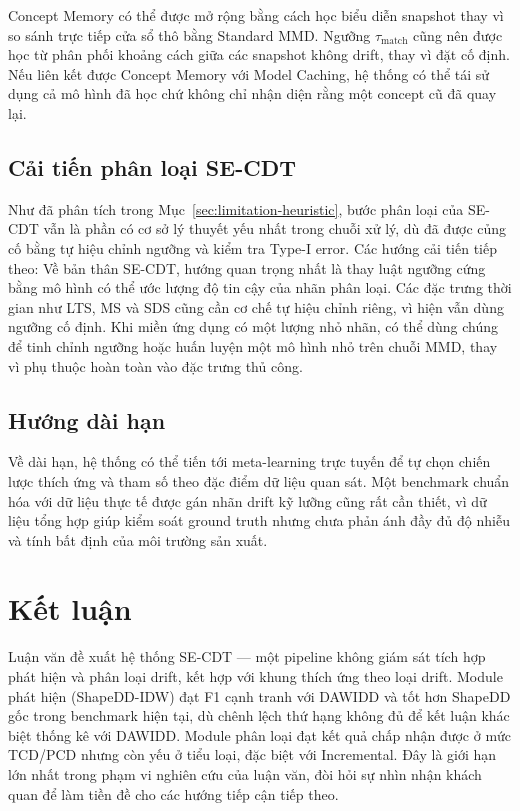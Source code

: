 Concept Memory có thể được mở rộng bằng cách học biểu diễn snapshot thay vì so sánh trực tiếp cửa sổ thô bằng Standard MMD. Ngưỡng $\tau_{\text{match}}$ cũng nên được học từ phân phối khoảng cách giữa các snapshot không drift, thay vì đặt cố định. Nếu liên kết được Concept Memory với Model Caching, hệ thống có thể tái sử dụng cả mô hình đã học chứ không chỉ nhận diện rằng một concept cũ đã quay lại.

\subsection{Cải tiến phân loại SE-CDT}
\label{sec:future-secdt-classification}
Như đã phân tích trong Mục~\ref{sec:limitation-heuristic}, bước phân loại của SE-CDT vẫn là phần có cơ sở lý thuyết yếu nhất trong chuỗi xử lý, dù đã được củng cố bằng tự hiệu chỉnh ngưỡng và kiểm tra Type-I error. Các hướng cải tiến tiếp theo:
Về bản thân SE-CDT, hướng quan trọng nhất là thay luật ngưỡng cứng bằng mô hình có thể ước lượng độ tin cậy của nhãn phân loại. Các đặc trưng thời gian như LTS, MS và SDS cũng cần cơ chế tự hiệu chỉnh riêng, vì hiện vẫn dùng ngưỡng cố định. Khi miền ứng dụng có một lượng nhỏ nhãn, có thể dùng chúng để tinh chỉnh ngưỡng hoặc huấn luyện một mô hình nhỏ trên chuỗi MMD, thay vì phụ thuộc hoàn toàn vào đặc trưng thủ công.

\subsection{Hướng dài hạn}
Về dài hạn, hệ thống có thể tiến tới meta-learning trực tuyến để tự chọn chiến lược thích ứng và tham số theo đặc điểm dữ liệu quan sát. Một benchmark chuẩn hóa với dữ liệu thực tế được gán nhãn drift kỹ lưỡng cũng rất cần thiết, vì dữ liệu tổng hợp giúp kiểm soát ground truth nhưng chưa phản ánh đầy đủ độ nhiễu và tính bất định của môi trường sản xuất.

\section{Kết luận}

Luận văn đề xuất hệ thống SE-CDT --- một pipeline không giám sát tích hợp phát hiện và phân loại drift, kết hợp với khung thích ứng theo loại drift. Module phát hiện (ShapeDD-IDW) đạt F1 cạnh tranh với DAWIDD và tốt hơn ShapeDD gốc trong benchmark hiện tại, dù chênh lệch thứ hạng không đủ để kết luận khác biệt thống kê với DAWIDD. Module phân loại đạt kết quả chấp nhận được ở mức TCD/PCD nhưng còn yếu ở tiểu loại, đặc biệt với Incremental. Đây là giới hạn lớn nhất trong phạm vi nghiên cứu của luận văn, đòi hỏi sự nhìn nhận khách quan để làm tiền đề cho các hướng tiếp cận tiếp theo.

